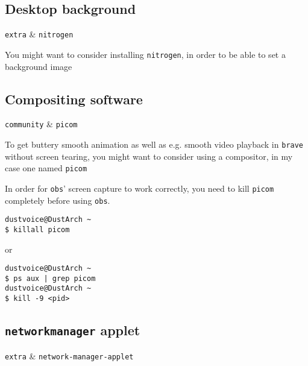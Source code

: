 \documentclass[10pt]{dustdoc}
\begin{document}
\subsection{Desktop background}
\label{sec:desktop-background}

\begin{packagetable}
    \texttt{extra} & \texttt{nitrogen} \\ 
\end{packagetable}

You might want to consider installing \texttt{nitrogen}, in order to be able to set a background image

\subsection{Compositing software}
\label{sec:compositing-software}

\begin{packagetable}
    \texttt{community} & \texttt{picom} \\ 
\end{packagetable}

To get buttery smooth animation as well as e.g. smooth video playback in \texttt{brave} without screen tearing, you might want to consider using a compositor, in my case one named \texttt{picom}

\begin{WARNING}
    In order for \texttt{obs}' screen capture to work correctly, you need to kill \texttt{picom} completely before using \texttt{obs}.

    \begin{verbatim}
dustvoice@DustArch ~
$ killall picom
    \end{verbatim}

    \noindent
    or

    \begin{verbatim}
dustvoice@DustArch ~
$ ps aux | grep picom
dustvoice@DustArch ~
$ kill -9 <pid>
    \end{verbatim}
\end{WARNING}

\subsection{\texttt{networkmanager} applet}
\label{sec:networkmanager-applet}

\begin{packagetable}
    \texttt{extra} & \texttt{network-manager-applet} \\ 
\end{packagetable}
\end{document}
